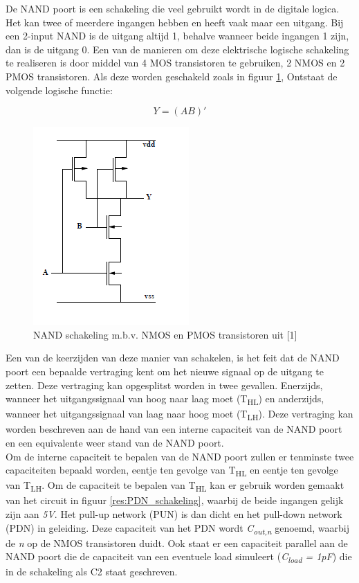 \documentclass{article}
\begin{document}
\newcommand{\tss}{\textsubscript}

De NAND poort is een schakeling die veel gebruikt wordt in de digitale logica. Het kan twee of meerdere ingangen hebben en heeft vaak maar een uitgang. Bij een 2-input NAND is de uitgang altijd 1, behalve wanneer beide ingangen 1 zijn, dan is de uitgang 0. Een van de manieren om deze elektrische logische schakeling te realiseren is door middel van 4 MOS transistoren te gebruiken, 2 NMOS en 2 PMOS transistoren. Als deze worden geschakeld zoals in figuur \ref{res:NAND_schakeling}, Ontstaat de volgende logische functie: 

\begin{equation}
Y = (AB)'
\end{equation}

 \begin{figure} [h!]
 \begin{center}
 \includegraphics [scale = 1] {figures/NAND}
 \caption{NAND schakeling m.b.v. NMOS en PMOS transistoren uit [1]}
 \label{res:NAND_schakeling}
 \end{center}
 \end{figure}

Een van de keerzijden van deze manier van schakelen, is het feit dat de NAND poort een bepaalde vertraging kent om het nieuwe signaal op de uitgang te zetten. Deze vertraging kan opgesplitst worden in twee gevallen. Enerzijds, wanneer het uitgangssignaal van hoog naar laag moet (T\tss{HL}) en anderzijds, wanneer het uitgangssignaal van laag naar hoog moet (T\tss{LH}). Deze vertraging kan worden beschreven aan de hand van een interne capaciteit van de NAND poort en een equivalente weer stand van de NAND poort.\\

Om de interne capaciteit te bepalen van de NAND poort zullen er tenminste twee capaciteiten bepaald worden, eentje ten gevolge van T\tss{HL} en eentje ten gevolge van T\tss{LH}. Om de capaciteit te bepalen van T\tss{HL} kan er gebruik worden gemaakt van het  circuit in figuur \ref{res:PDN_schakeling}, waarbij de beide ingangen gelijk zijn aan \emph{5V}. Het pull-up network (PUN) is dan dicht en het pull-down network (PDN) in geleiding. Deze capaciteit van het PDN wordt \emph{C\tss{out,n}} genoemd, waarbij de \emph{n} op de NMOS transistoren duidt. Ook staat er een capaciteit parallel aan de NAND poort die de capaciteit van een eventuele load simuleert (\emph{C\tss{load} = 1pF}) die in de schakeling als C2 staat geschreven.
\end{document}
